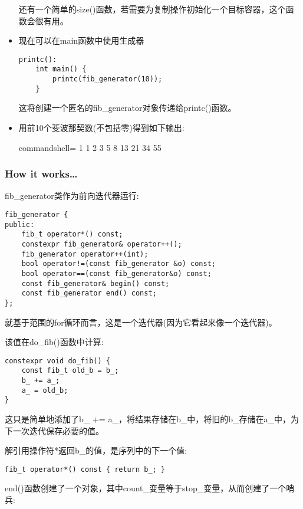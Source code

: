 \begin{itemize}
还有一个简单的size()函数，若需要为复制操作初始化一个目标容器，这个函数会很有用。

\item 
现在可以在main函数中使用生成器

\begin{lstlisting}[style=styleCXX]
printc():
	int main() {
		printc(fib_generator(10));
	}
\end{lstlisting}

这将创建一个匿名的fib\_generator对象传递给printc()函数。

\item 
用前10个斐波那契数(不包括零)得到如下输出:

\begin{tcblisting}{commandshell={}}
1 1 2 3 5 8 13 21 34 55
\end{tcblisting}
\end{itemize}

\subsubsection{How it works…}

fib\_generator类作为前向迭代器运行:

\begin{lstlisting}[style=styleCXX]
fib_generator {
public:
	fib_t operator*() const;
	constexpr fib_generator& operator++();
	fib_generator operator++(int);
	bool operator!=(const fib_generator &o) const;
	bool operator==(const fib_generator&o) const;
	const fib_generator& begin() const;
	const fib_generator end() const;
};
\end{lstlisting}

就基于范围的for循环而言，这是一个迭代器(因为它看起来像一个迭代器)。

该值在do\_fib()函数中计算:

\begin{lstlisting}[style=styleCXX]
constexpr void do_fib() {
	const fib_t old_b = b_;
	b_ += a_;
	a_ = old_b;
}
\end{lstlisting}

这只是简单地添加了b\_ += a\_，将结果存储在b\_中，将旧的b\_存储在a\_中，为下一次迭代保存必要的值。

解引用操作符*返回b\_的值，是序列中的下一个值:

\begin{lstlisting}[style=styleCXX]
fib_t operator*() const { return b_; }
\end{lstlisting}

end()函数创建了一个对象，其中count\_变量等于stop\_变量，从而创建了一个哨兵:

